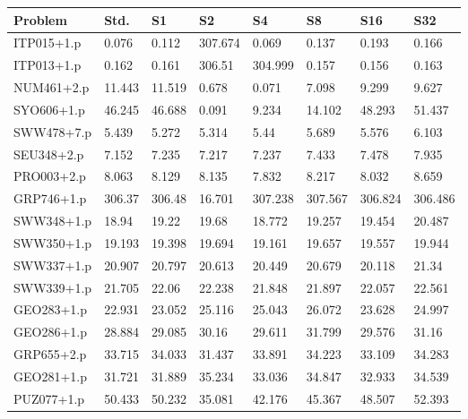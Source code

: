 \documentclass[]{ceurart}
\begin{document}
\begin{table}[!ht]
    \centering
    \begin{tabular}{|l|l|l|l|l|l|l|l|}
    \hline
        \textbf{Problem} & \textbf{Std.} & \textbf{S1} & \textbf{S2} & \textbf{S4} & \textbf{S8} & \textbf{S16} & \textbf{S32} \\\hline
        {\color{blue} ITP015+1.p} & 0.076 & 0.112 & 307.674 & 0.069 & 0.137 & 0.193 & 0.166 \\ \hline
        {\color{blue} ITP013+1.p} & 0.162 & 0.161 & 306.51 & 304.999 & 0.157 & 0.156 & 0.163 \\ \hline
        {\color{blue} NUM461+2.p} & 11.443 & 11.519 & 0.678 & 0.071 & 7.098 & 9.299 & 9.627 \\ \hline
        {\color{blue} SYO606+1.p} & 46.245 & 46.688 & 0.091 & 9.234 & 14.102 & 48.293 & 51.437 \\ \hline
        SWW478+7.p & 5.439 & 5.272 & 5.314 & 5.44 & 5.689 & 5.576 & 6.103 \\ \hline
        SEU348+2.p & 7.152 & 7.235 & 7.217 & 7.237 & 7.433 & 7.478 & 7.935 \\ \hline
        PRO003+2.p & 8.063 & 8.129 & 8.135 & 7.832 & 8.217 & 8.032 & 8.659 \\ \hline
        {\color{blue} GRP746+1.p} & 306.37 & 306.48 & 16.701 & 307.238 & 307.567 & 306.824 & 306.486 \\ \hline
        SWW348+1.p & 18.94 & 19.22 & 19.68 & 18.772 & 19.257 & 19.454 & 20.487 \\ \hline
        SWW350+1.p & 19.193 & 19.398 & 19.694 & 19.161 & 19.657 & 19.557 & 19.944 \\ \hline
        SWW337+1.p & 20.907 & 20.797 & 20.613 & 20.449 & 20.679 & 20.118 & 21.34 \\ \hline
        SWW339+1.p & 21.705 & 22.06 & 22.238 & 21.848 & 21.897 & 22.057 & 22.561 \\ \hline
        GEO283+1.p & 22.931 & 23.052 & 25.116 & 25.043 & 26.072 & 23.628 & 24.997 \\ \hline
        GEO286+1.p & 28.884 & 29.085 & 30.16 & 29.611 & 31.799 & 29.576 & 31.16 \\ \hline
        GRP655+2.p & 33.715 & 34.033 & 31.437 & 33.891 & 34.223 & 33.109 & 34.283 \\ \hline
        GEO281+1.p & 31.721 & 31.889 & 35.234 & 33.036 & 34.847 & 32.933 & 34.539 \\ \hline
        PUZ077+1.p & 50.433 & 50.232 & 35.081 & 42.176 & 45.367 & 48.507 & 52.393 \\ \hline

\end{tabular}
\end{table}
\end{document}
